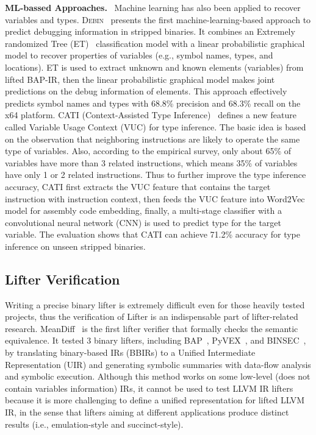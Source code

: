 \noindent\textbf{ML-bassed Approaches.}~
Machine learning has also been applied to recover variables and types. \textsc
{Debin}~\cite{he2018debin} presents the first machine-learning-based approach 
to predict debugging information in stripped binaries. It combines an Extremely 
randomized Tree (ET)~\cite{geurts2006extremely} classification model with a 
linear probabilistic graphical model to recover properties of variables (e.g., 
symbol names, types, and locations). ET is used to extract unknown and known 
elements (variables) from lifted BAP-IR, then the linear probabilistic 
graphical model makes joint predictions on the debug information of elements. 
This approach effectively predicts symbol names and types with 68.8\% precision 
and 68.3\% recall on the x64 platform.
CATI (Context-Assisted Type Inference)~\cite{chen2020cati} defines a new 
feature called Variable Usage Context (VUC) for type inference. The basic idea 
is based on the observation that neighboring instructions are likely to operate 
the same type of variables. Also, according to the empirical survey, only about 
65\% of variables have more than 3 related instructions, which means 35\% of 
variables have only 1 or 2 related instructions. Thus to further improve the 
type inference accuracy, CATI first extracts the VUC feature that contains the 
target instruction with instruction context, then feeds the VUC feature into 
Word2Vec~\cite{mikolov2013distributed} model for assembly code embedding, 
finally, a multi-stage classifier with a convolutional neural network (CNN) is 
used to predict type for the target variable. The evaluation shows that CATI 
can achieve 71.2\% accuracy for type inference on unseen stripped binaries.


\subsection{Lifter Verification} \label{sec:existing-lifter-verfication}
Writing a precise binary lifter is extremely difficult even for those heavily 
tested projects, thus the verification of Lifter is an indispensable part of 
lifter-related research.
MeanDiff~\cite{kim2017testing} is the first lifter verifier that formally 
checks the semantic equivalence. It tested 3 binary lifters, including BAP~\cite
{brumley2011bap}, PyVEX~\cite{pyvex}, and BINSEC~\cite{bardin2011bincoa}, by 
translating binary-based IRs (BBIRs) to a Unified Intermediate Representation 
(UIR) and generating symbolic summaries with data-flow analysis and symbolic 
execution. Although this method works on some low-level (does not contain 
variables information) IRs, it cannot be used to test LLVM IR lifters because 
it is more challenging to define a unified representation for lifted LLVM IR, 
in the sense that lifters aiming at different applications produce distinct 
results (i.e., emulation-style and succinct-style).

